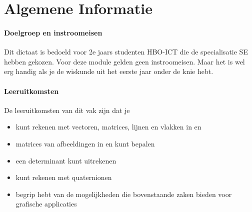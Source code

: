 


\chapter{Algemene Informatie}
\label{chap:algemeneinformatie}

\subsubsection{Doelgroep en instroomeisen}
Dit dictaat is bedoeld voor 2e jaars studenten HBO-ICT die de specialisatie SE hebben gekozen. Voor deze module gelden geen instroomeisen. Maar het is wel erg handig als je de wiskunde uit het eerste jaar onder de knie hebt.

\subsubsection*{Leeruitkomsten}
De leeruitkomsten van dit vak zijn dat je
\begin{itemize}
        \setlength\itemsep{-1pt}
        \item kunt rekenen met vectoren, matrices, lijnen en vlakken  in \RT en \RD
        \item matrices van afbeeldingen in \RT en \RD kunt bepalen
        \item een determinant kunt uitrekenen
        \item kunt rekenen met quaternionen
        \item begrip hebt van de mogelijkheden die bovenstaande zaken bieden voor grafische applicaties
        \newline
    \end{itemize}

